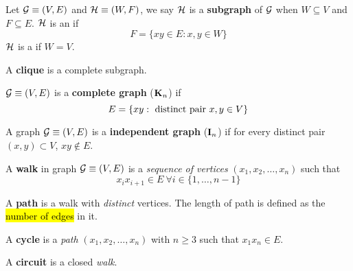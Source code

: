 \documentclass{article}
\begin{document}
		\begin{definition}
			Let $\mathcal{{G}} \equiv (V, E)$ and $\mathcal{{H}} \equiv (W, F)$, we say $\mathcal{{H}}$ is a \textbf{subgraph} of $\mathcal{{G}}$ when $W \subseteq V$ and $F \subseteq E$. $\mathcal{{H}}$ is an  if
			\begin{equation}
				F = \{xy \in E: x, y \in W\}	
			\end{equation}
			$\mathcal{{H}}$ is a  if $W = V$.
		\end{definition}
		
		\begin{definition}
			A \textbf{clique} is a complete subgraph.
		\end{definition}
		
		\begin{definition}
			$\mathcal{{G}} \equiv (V, E)$ is a \textbf{complete graph} ($\textbf{K}_n$) if 
			\begin{equation}
				E = \{xy: \text{{ distinct pair }} x, y \in V\}
			\end{equation}
		\end{definition}
		
		\begin{definition}
			A graph $\mathcal{{G}} \equiv (V, E)$ is a \textbf{independent graph} ($\textbf{I}_n$) if for every distinct pair $(x, y) \subset V$, $xy \notin E$.
		\end{definition}
		
		\begin{definition}
			A \textbf{walk} in graph $\mathcal{{G}} \equiv (V, E)$ is a \emph{sequence of vertices} $(x_1, x_2, \dots, x_n)$ such that 
			\begin{equation}
				x_ix_{i+1} \in E\  \forall i \in \{1,\dots,n-1\}
			\end{equation}
		\end{definition}
		
		\begin{definition}
			A \textbf{path} is a walk with \emph{distinct} vertices. The length of path is defined as the \hl{number of edges} in it.
		\end{definition}
		
		\begin{definition}
			A \textbf{cycle} is a \emph{path} $(x_1, x_2, \dots, x_n)$ with $n \geq 3$ such that $x_1x_n \in E$.
		\end{definition}
		
		\begin{definition}
			A \textbf{circuit} is a closed \emph{walk}.
		\end{definition}
		
\end{document}
